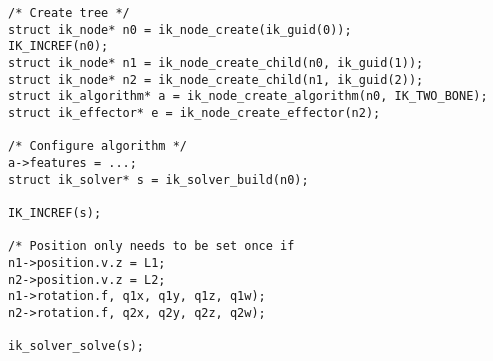 \def\thetaone{30}
\def\Lone{2}
\def\thetatwo{30}
\def\Ltwo{2}
\def\thetathree{30}
\def\Lthree{2}


\lstset{style=cstyle}
\begin{lstlisting}
/* Create tree */
struct ik_node* n0 = ik_node_create(ik_guid(0));
IK_INCREF(n0);
struct ik_node* n1 = ik_node_create_child(n0, ik_guid(1));
struct ik_node* n2 = ik_node_create_child(n1, ik_guid(2));
struct ik_algorithm* a = ik_node_create_algorithm(n0, IK_TWO_BONE);
struct ik_effector* e = ik_node_create_effector(n2);

/* Configure algorithm */
a->features = ...;
struct ik_solver* s = ik_solver_build(n0);

IK_INCREF(s);

/* Position only needs to be set once if
n1->position.v.z = L1;
n2->position.v.z = L2;
n1->rotation.f, q1x, q1y, q1z, q1w);
n2->rotation.f, q2x, q2y, q2z, q2w);

ik_solver_solve(s);

\end{lstlisting}

